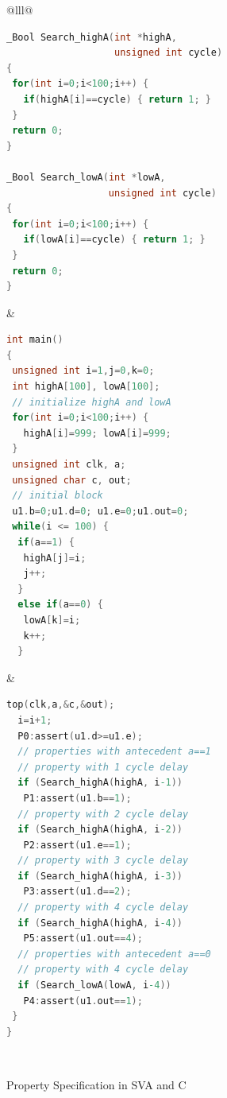 \begin{figure}[bth]
\small
\begin{center}
\begin{tabular}{@{}lll@{}}
\hline
\begin{lstlisting}[boxpos=t,mathescape=true,language=C,basicstyle=\scriptsize\ttfamily]
_Bool Search_highA(int *highA, 
                   unsigned int cycle)
{
 for(int i=0;i<100;i++) { 
   if(highA[i]==cycle) { return 1; }
 }
 return 0;
} 

_Bool Search_lowA(int *lowA, 
                  unsigned int cycle)
{
 for(int i=0;i<100;i++) { 
   if(lowA[i]==cycle) { return 1; }
 }
 return 0;
} 
\end{lstlisting}
&
\begin{lstlisting}[boxpos=t,mathescape=true,language=C,basicstyle=\scriptsize\ttfamily]
int main() 
{
 unsigned int i=1,j=0,k=0;
 int highA[100], lowA[100];
 // initialize highA and lowA
 for(int i=0;i<100;i++) { 
   highA[i]=999; lowA[i]=999;
 }
 unsigned int clk, a;
 unsigned char c, out;
 // initial block 
 u1.b=0;u1.d=0; u1.e=0;u1.out=0; 
 while(i <= 100) {
  if(a==1) {  
   highA[j]=i; 
   j++;
  } 
  else if(a==0) {
   lowA[k]=i;
   k++;
  }
\end{lstlisting}
& 
\begin{lstlisting}[boxpos=t,mathescape=true,language=C,basicstyle=\scriptsize\ttfamily]
  top(clk,a,&c,&out);
  i=i+1; 
  P0:assert(u1.d>=u1.e);
  // properties with antecedent a==1 
  // property with 1 cycle delay
  if (Search_highA(highA, i-1)) 
   P1:assert(u1.b==1);
  // property with 2 cycle delay
  if (Search_highA(highA, i-2))
   P2:assert(u1.e==1); 
  // property with 3 cycle delay
  if (Search_highA(highA, i-3))
   P3:assert(u1.d==2); 
  // property with 4 cycle delay
  if (Search_highA(highA, i-4))
   P5:assert(u1.out==4); 
  // properties with antecedent a==0
  // property with 4 cycle delay
  if (Search_lowA(lowA, i-4)) 
   P4:assert(u1.out==1);
 }
}
\end{lstlisting}\\
\hline
\end{tabular}
	\caption{Property Specification in SVA and C}
\label{fig:sva}
\end{center}
\end{figure}

